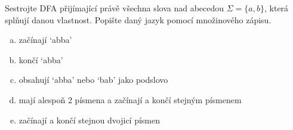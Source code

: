 \documentclass[a4paper,12pt]{amsart}
\begin{document}
\medskip\begin{problem}

    Sestrojte DFA přijímající právě všechna slova nad abecedou $\Sigma=\{a,b\}$, která splňují danou vlastnost. Popište daný jazyk pomocí množinového zápisu.

    \medskip

    \begin{enumerate}[(a)]\setlength\itemsep{12pt}
        \item začínají `abba'
        \item končí `abba'
        \item obsahují `abba' nebo `bab' jako podslovo
        \item mají alespoň 2 písmena a začínají a končí stejným písmenem
        \item začínají a končí stejnou dvojicí písmen
    \end{enumerate}

\end{problem}
\end{document}
